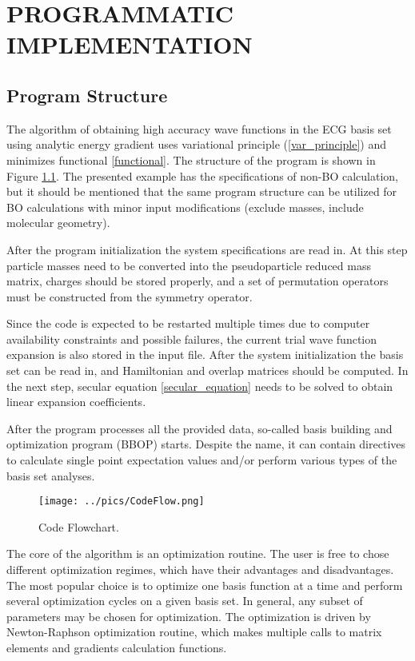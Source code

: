 \chapter{PROGRAMMATIC IMPLEMENTATION\label{prog}}

\section{Program Structure}

The algorithm of obtaining high accuracy wave functions
in the ECG basis set using analytic energy gradient
uses variational principle (\ref{var_principle})
and minimizes functional \ref{functional}.
The structure of the program is shown in Figure \ref{codeflow}.
The presented example has the specifications of non-BO calculation,
but it should be mentioned that the same program structure can be 
utilized for BO calculations with minor input modifications
(exclude masses, include molecular geometry). 

After the program initialization the system specifications
are read in. At this step particle masses need to be 
converted into the pseudoparticle reduced mass matrix,
charges should be stored properly, and a set of 
permutation operators must be constructed from the
symmetry operator.

Since the code is expected to be restarted multiple times
due to computer availability constraints and possible
failures, the current trial wave function expansion
is also stored in the input file. After the system
initialization the basis set can be read in, and 
Hamiltonian and overlap matrices should be computed.
In the next step, secular equation \ref{secular_equation}
needs to be solved to obtain linear expansion coefficients.

After the program processes all the provided data, 
so-called basis building and optimization program (BBOP)
starts. Despite the name, it can contain directives to
calculate single point expectation values and/or perform
various types of the basis set analyses.

\begin{figure}[H]
\begin{center}
\texttt{[image: ../pics/CodeFlow.png]}
\caption[Code Flowchart]{Code Flowchart. \label{codeflow}}
\end{center}
\end{figure}

The core of the algorithm is an optimization routine.
The user is free to chose different optimization regimes,
which have their advantages and disadvantages. The most
popular choice is to optimize one basis function at a time
and perform several optimization cycles on a given basis
set. In general, any subset of parameters may be chosen for 
optimization. The optimization is driven by 
Newton-Raphson optimization routine, which makes multiple
calls to matrix elements and gradients calculation 
functions.

